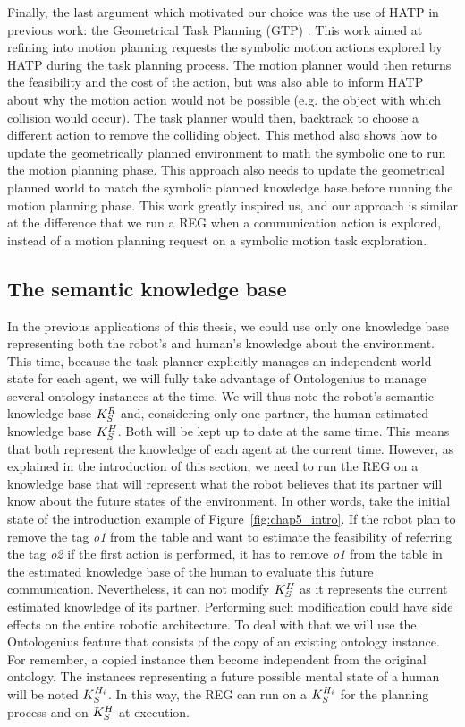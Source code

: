Finally, the last argument which motivated our choice was the use of HATP in previous work: the Geometrical Task Planning (GTP) \cite{gharbi_2015_combining}. This work aimed at refining into motion planning requests the symbolic motion actions explored by HATP during the task planning process. The motion planner would then returns the feasibility and the cost of the action, but was also able to inform HATP about why the motion action would not be possible (e.g. the object with which collision would occur). The task planner would then, backtrack to choose a different action to remove the colliding object. This method also shows how to update the geometrically planned environment to math the symbolic one to run the motion planning phase. This approach also needs to update the geometrical planned world to match the symbolic planned knowledge base before running the motion planning phase. This work greatly inspired us, and our approach is similar at the difference that we run a REG when a communication action is explored, instead of a motion planning request on a symbolic motion task exploration.

\subsection{The semantic knowledge base}

In the previous applications of this thesis, we could use only one knowledge base representing both the robot's and human's knowledge about the environment. This time, because the task planner explicitly manages an independent world state for each agent, we will fully take advantage of Ontologenius to manage several ontology instances at the time. We will thus note the robot's semantic knowledge base $K_S^R$ and, considering only one partner, the human estimated knowledge base $K_S^H$. Both will be kept up to date at the same time. This means that both represent the knowledge of each agent at the current time. However, as explained in the introduction of this section, we need to run the REG on a knowledge base that will represent what the robot believes that its partner will know about the future states of the environment. In other words, take the initial state of the introduction example of Figure~\ref{fig:chap5_intro}. If the robot plan to remove the tag \textit{o1} from the table and want to estimate the feasibility of referring the tag \textit{o2} if the first action is performed, it has to remove \textit{o1} from the table in the estimated knowledge base of the human to evaluate this future communication. Nevertheless, it can not modify $K_S^H$ as it represents the current estimated knowledge of its partner. Performing such modification could have side effects on the entire robotic architecture. To deal with that we will use the Ontologenius feature that consists of the copy of an existing ontology instance. For remember, a copied instance then become independent from the original ontology. The instances representing a future possible mental state of a human will be noted $K_S^{H_i}$. In this way, the REG can run on a $K_S^{H_i}$ for the planning process and on $K_S^H$ at execution.


